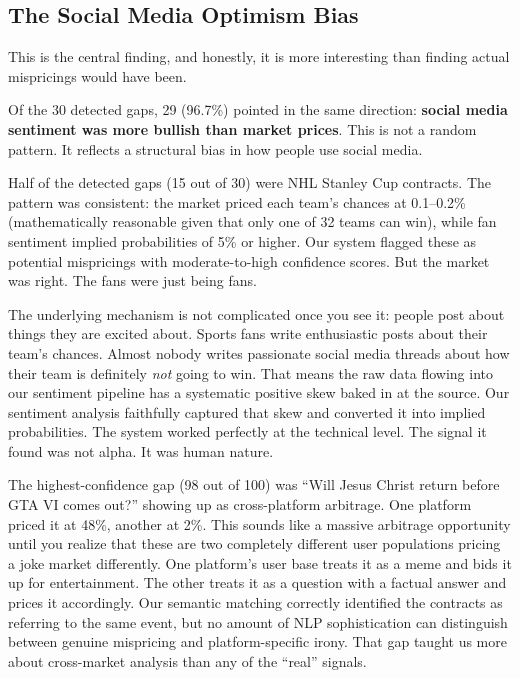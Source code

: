 \documentclass[conference]{IEEEtran}
\begin{document}
\subsection{The Social Media Optimism Bias}

This is the central finding, and honestly, it is more interesting than finding actual mispricings would have been.

Of the 30 detected gaps, 29 (96.7\%) pointed in the same direction: \textbf{social media sentiment was more bullish than market prices}. This is not a random pattern. It reflects a structural bias in how people use social media.

Half of the detected gaps (15 out of 30) were NHL Stanley Cup contracts. The pattern was consistent: the market priced each team's chances at 0.1--0.2\% (mathematically reasonable given that only one of 32 teams can win), while fan sentiment implied probabilities of 5\% or higher. Our system flagged these as potential mispricings with moderate-to-high confidence scores. But the market was right. The fans were just being fans.

The underlying mechanism is not complicated once you see it: people post about things they are excited about. Sports fans write enthusiastic posts about their team's chances. Almost nobody writes passionate social media threads about how their team is definitely \emph{not} going to win. That means the raw data flowing into our sentiment pipeline has a systematic positive skew baked in at the source. Our sentiment analysis faithfully captured that skew and converted it into implied probabilities. The system worked perfectly at the technical level. The signal it found was not alpha. It was human nature.

The highest-confidence gap (98 out of 100) was ``Will Jesus Christ return before GTA VI comes out?'' showing up as cross-platform arbitrage. One platform priced it at 48\%, another at 2\%. This sounds like a massive arbitrage opportunity until you realize that these are two completely different user populations pricing a joke market differently. One platform's user base treats it as a meme and bids it up for entertainment. The other treats it as a question with a factual answer and prices it accordingly. Our semantic matching correctly identified the contracts as referring to the same event, but no amount of NLP sophistication can distinguish between genuine mispricing and platform-specific irony. That gap taught us more about cross-market analysis than any of the ``real'' signals.
\end{document}
